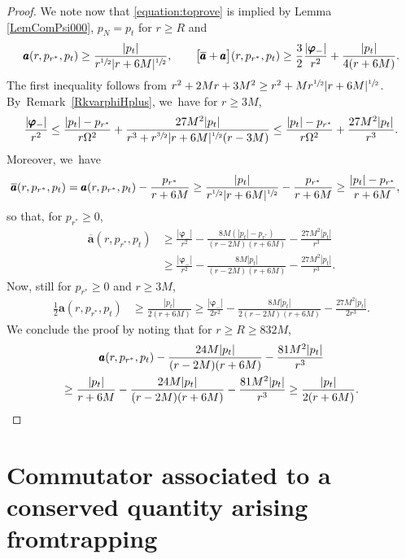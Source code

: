 \documentclass[10pt]{amsart}
\theoremstyle{plain}
\theoremstyle{definition}
\begin{document}
\begin{proof}
We note now that \eqref{equation:toprove} is implied by Lemma \ref{LemComPsi000}, $p_N=p_t$ for $r \geq R$ and
\[
\pmb{a}(r,p_{r^*},p_t) \geq \frac{|p_t|}{r^{\sfrac{1}{2}}|r+6M|^{\sfrac{1}{2}}},\qquad \bigl[\overline{\pmb{a}}+\pmb{a} \bigr](r,p_{r^*},p_t) \geq \frac{3}{2}\frac{|\pmb{\varphi}_-|}{r^2}+\frac{|p_t|}{4(r+6M)}.
\]
The first inequality follows from $r^2+2Mr+3M^2 \geq r^2+Mr^{\sfrac{1}{2}}|r+6M|^{\sfrac{1}{2}}$. By~Remark~\ref{RkvarphiHplus}, we~have for $r \geq 3M$,
\[
\frac{|\pmb{\varphi}_-|}{r^2} \leq \frac{|p_t|-p_{r^*} }{r \Omega^2} +\frac{27M^2 |p_t|}{r^3+r^{\sfrac{3}{2}}|r+6M|^{\sfrac{1}{2}}(r-3M)} \leq \frac{|p_t|-p_{r^*}}{r \Omega^2} +\frac{27M^2 |p_t|}{r^3}.
\]
Moreover, we~have
\begin{align*}
\overline{\pmb{a}}(r,p_{r^*},p_t) & = \pmb{a}(r,p_{r^*},p_t)-\frac{p_{r^*}}{r+6M} \geq \frac{|p_t|}{r^{\sfrac{1}{2}}|r+6M|^{\sfrac{1}{2}}}-\frac{p_{r^*}}{r+6M} \geq \frac{|p_t|-p_{r^*}}{r+6M},
\end{align*}
so that, for $p_{r^*} \geq 0$,
\begin{align*}
\overline{\pmb{a}}(r,p_{r^*},p_t) & \geq \frac{|\pmb{\varphi}_-|}{r^2}-\frac{8M(|p_t|-p_{r^*})}{(r-2M)(r+6M)}-\frac{27M^2 |p_t|}{r^3} \\
& \geq \frac{|\pmb{\varphi}_-|}{r^2}-\frac{8M|p_t|}{(r-2M)(r+6M)}-\frac{27M^2 |p_t|}{r^3}.
\end{align*}
Now, still for $p_{r^*} \geq 0$ and $r \geq 3M$,
\begin{align*}
\frac{1}{2}\pmb{a}(r,p_{r^*},p_t) & \geq \frac{|p_t|}{2(r+6M)} \geq \frac{|\pmb{\varphi}_-|}{2r^2}-\frac{8M|p_t|}{2(r-2M)(r+6M)} -\frac{27M^2 |p_t|}{2r^3}.
\end{align*}
We conclude the proof by noting that for $r \geq R \geq 832M$,
\begin{multline*}
\pmb{a}(r,p_{r^*},p_t)-\frac{24M|p_t|}{(r-2M)(r+6M)} -\frac{81M^2 |p_t|}{r^3} \\
\geq \frac{|p_t|}{r+6M}-\frac{24M|p_t|}{(r-2M)(r+6M)} -\frac{81M^2 |p_t|}{r^3} \geq \frac{|p_t|}{2(r+6M)}.\qedhere
\end{multline*}
\end{proof}

\section{Commutator associated to a conserved quantity arising\texorpdfstring{\\}{cr} from\nobreakspace trapping}\label{SecCotan}
\end{document}
